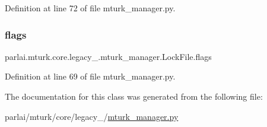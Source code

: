 Definition at line 72 of file mturk\+\_\+manager.\+py.

\mbox{\label{classparlai_1_1mturk_1_1core_1_1legacy__2018_1_1mturk__manager_1_1LockFile_acb708dbda28b3ef729944cb0cbc1ef9d}} 
\subsubsection{\texorpdfstring{flags}{flags}}
{\footnotesize\ttfamily parlai.\+mturk.\+core.\+legacy\+\_.\+mturk\+\_\+manager.\+Lock\+File.\+flags\hspace{0.3cm}{\ttfamily [static]}}



Definition at line 69 of file mturk\+\_\+manager.\+py.



The documentation for this class was generated from the following file\+:\begin{DoxyCompactItemize}
\item 
parlai/mturk/core/legacy\+\_/\hyperlink{legacy__2018_2mturk__manager_8py}{mturk\+\_\+manager.\+py}\end{DoxyCompactItemize}
